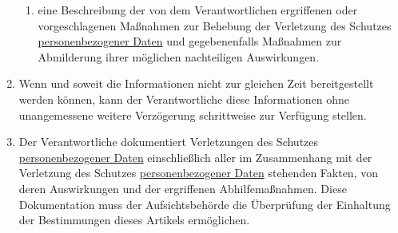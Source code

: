 \begin{enumerate}
\begin{enumerate}
    \item eine Beschreibung der von dem Verantwortlichen ergriffenen oder vorgeschlagenen Maßnahmen zur Behebung der
     Verletzung des Schutzes \hyperref[itm:04-1]{personenbezogener Daten} und gegebenenfalls Maßnahmen zur Abmilderung ihrer möglichen
     nachteiligen Auswirkungen.
    \label{itm:33-3d}

  \end{enumerate}

  \item Wenn und soweit die Informationen nicht zur gleichen Zeit bereitgestellt werden können, kann der Verantwortliche
   diese Informationen ohne unangemessene weitere Verzögerung schrittweise zur Verfügung stellen.
  \label{itm:33-4}

  \item Der Verantwortliche dokumentiert Verletzungen des Schutzes \hyperref[itm:04-1]{personenbezogener Daten} einschließlich aller im
   Zusammenhang mit der Verletzung des Schutzes \hyperref[itm:04-1]{personenbezogener Daten} stehenden Fakten, von deren Auswirkungen und
   der ergriffenen Abhilfemaßnahmen. Diese Dokumentation muss der Aufsichtsbehörde die Überprüfung der Einhaltung der
   Bestimmungen dieses Artikels ermöglichen.
  \label{itm:33-5}

\end{enumerate}


